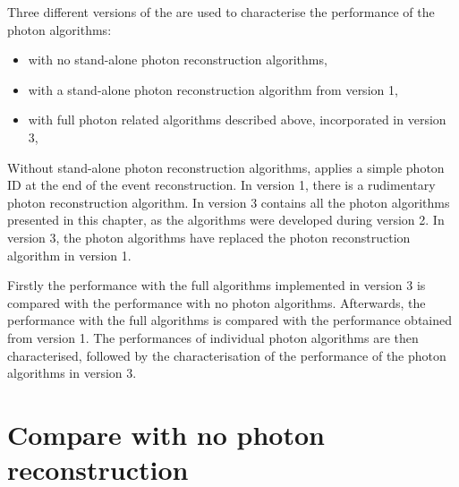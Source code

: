 
Three different versions of the \pandora are used to characterise  the performance of the photon algorithms:
\begin{itemize}
  \item with no stand-alone photon reconstruction algorithms,
  \item with a stand-alone photon reconstruction algorithm from \pandora version 1,
  \item with full photon related algorithms described above, incorporated in \pandora version 3,
\end{itemize}

Without stand-alone photon reconstruction algorithms, \pandora applies a simple photon ID at the end of the event reconstruction. In \pandora version 1, there is a rudimentary photon reconstruction algorithm. In \pandora version 3 contains all the photon algorithms presented in this chapter, as the algorithms  were developed during \pandora version 2. In \pandora version 3, the photon algorithms  have replaced the   photon reconstruction algorithm in \pandora version 1.

Firstly the performance with the full algorithms implemented in \pandora version 3 is compared with the performance with no photon algorithms. Afterwards, the performance with  the full algorithms is compared with the performance obtained from  \pandora version 1. The performances of individual photon algorithms are then characterised, followed by the characterisation of the performance of the photon algorithms in \pandora version 3.

\section{Compare with no photon reconstruction}

